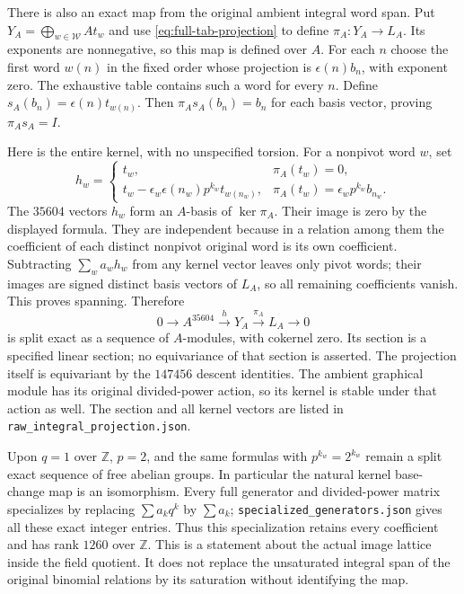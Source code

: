 There is also an exact map from the original ambient integral
word span. Put $Y_A=\bigoplus_{w\in\mathcal W}At_w$ and
use \eqref{eq:full-tab-projection} to define
$\pi_A:Y_A\to L_A$. Its exponents are nonnegative, so this
map is defined over $A$. For each $n$ choose the first word
$w(n)$ in the fixed order whose projection is
$\epsilon(n)b_n$, with exponent zero. The exhaustive table
contains such a word for every $n$. Define
$s_A(b_n)=\epsilon(n)t_{w(n)}$. Then
$\pi_As_A(b_n)=b_n$ for each basis vector, proving
$\pi_As_A=I$.

Here is the entire kernel, with no unspecified torsion. For a
nonpivot word $w$, set
\[
 h_w=\begin{cases}
 t_w,&\pi_A(t_w)=0,\\
 t_w-\epsilon_w\epsilon(n_w)p^{k_w}t_{w(n_w)},
       &\pi_A(t_w)=\epsilon_wp^{k_w}b_{n_w}.
 \end{cases}
\]
The $35604$ vectors $h_w$ form an $A$-basis of $\ker\pi_A$.
Their image is zero by the displayed formula. They are
independent because in a relation among them the coefficient
of each distinct nonpivot original word is its own coefficient.
Subtracting $\sum_w a_wh_w$ from any kernel vector leaves
only pivot words; their images are signed distinct basis
vectors of $L_A$, so all remaining coefficients vanish.
This proves spanning. Therefore
\begin{equation}\label{eq:full-integral-split}
 0\longrightarrow A^{35604}\xrightarrow{h}Y_A
 \xrightarrow{\pi_A}L_A\longrightarrow0
\end{equation}
is split exact as a sequence of $A$-modules, with cokernel
zero. Its section is a specified linear section; no
equivariance of that section is asserted. The projection
itself is equivariant by the $147456$ descent identities.
The ambient graphical module has its original divided-power
action, so its kernel is stable under that action as well.
The section and all kernel vectors are listed in
\texttt{raw\_integral\_projection.json}.

Upon $q=1$ over $\mathbb Z$, $p=2$, and the same formulas
with $p^{k_w}=2^{k_w}$ remain a split exact sequence of free
abelian groups. In particular the natural kernel base-change
map is an isomorphism. Every full generator and divided-power
matrix specializes by replacing $\sum a_kq^k$ by $\sum a_k$;
\texttt{specialized\_generators.json} gives all these exact
integer entries. Thus this specialization retains every
coefficient and has rank $1260$ over $\mathbb Z$.
This is a statement about the actual image lattice inside
the field quotient. It does not replace the unsaturated
integral span of the original binomial relations by its
saturation without identifying the map.

